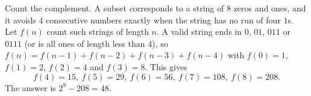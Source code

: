 Count the complement. A subset corresponds to a string of $8$ zeros and ones, and it avoids $4$ consecutive numbers exactly when the string has no run of four $1$s. Let $f(n)$ count such strings of length $n$. A valid string ends in $0$, $01$, $011$ or $0111$ (or is all ones of length less than $4$), so $f(n)=f(n-1)+f(n-2)+f(n-3)+f(n-4)$ with $f(0)=1$, $f(1)=2$, $f(2)=4$ and $f(3)=8$. This gives
\[f(4)=15,\ f(5)=29,\ f(6)=56,\ f(7)=108,\ f(8)=208.\]
The answer is $2^8-208=\boxed{48}$.
